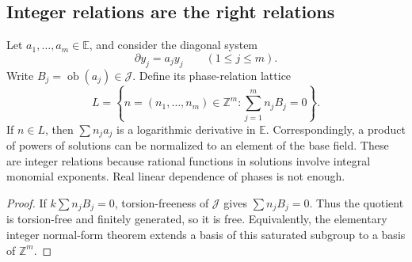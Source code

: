 \documentclass[11pt,a4paper]{article}
\numberwithin{equation}{section}
\newtheorem{lemma}[theorem]{Lemma}
\theoremstyle{definition}
\theoremstyle{remark}
\newcommand{\E}{\mathbb E}
\newcommand{\Z}{\mathbb Z}
\newcommand{\J}{\mathcal J}
\newcommand{\D}{\partial}
\newcommand{\ob}{\operatorname{ob}}
\begin{document}
\subsection{Integer relations are the right relations}
Let $a_1,\ldots,a_m\in\E$, and consider the diagonal system
\[
 \D y_j=a_jy_j\qquad(1\leq j\leq m).
\]
Write $B_j=\ob(a_j)\in\J$. Define its phase-relation lattice
\begin{equation}\label{eq:lattice}
 L=\left\{n=(n_1,\ldots,n_m)\in\Z^m:
               \sum_{j=1}^{m}n_jB_j=0\right\}.
\end{equation}
If $n\in L$, then $\sum n_ja_j$ is a logarithmic derivative in $\E$.
Correspondingly, a product of powers of solutions can be normalized to an
element of the base field. These are integer relations because rational
functions in solutions involve integral monomial exponents. Real linear
dependence of phases is not enough.

\begin{proof}
If $k\sum n_jB_j=0$, torsion-freeness of $\J$ gives
$\sum n_jB_j=0$. Thus the quotient is torsion-free and finitely generated,
so it is free. Equivalently, the elementary integer normal-form theorem
extends a basis of this saturated subgroup to a basis of $\Z^m$.
\end{proof}
\end{document}

